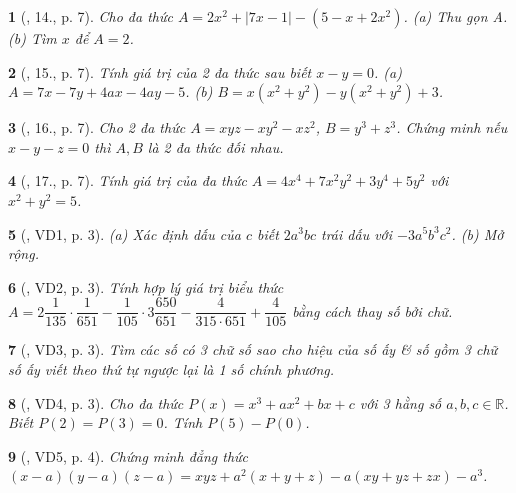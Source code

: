 \documentclass{article}
\newtheorem{baitoan}{}
\begin{document}
\begin{baitoan}[\cite{Tuyen_Toan_8}, 14., p. 7]
	Cho đa thức $A = 2x^2 + |7x - 1| - (5 - x + 2x^2)$. (a) Thu gọn A. (b) Tìm $x$ để $A = 2$.
\end{baitoan}

\begin{baitoan}[\cite{Tuyen_Toan_8}, 15., p. 7]
	Tính giá trị của 2 đa thức sau biết $x - y = 0$. (a) $A = 7x - 7y + 4ax - 4ay - 5$. (b) $B = x(x^2 + y^2) - y(x^2 + y^2) + 3$.
\end{baitoan}

\begin{baitoan}[\cite{Tuyen_Toan_8}, 16., p. 7]
	Cho 2 đa thức $A = xyz - xy^2 - xz^2$, $B = y^3 + z^3$. Chứng minh nếu $x - y - z = 0$ thì $A,B$ là 2 đa thức đối nhau.
\end{baitoan}

\begin{baitoan}[\cite{Tuyen_Toan_8}, 17., p. 7]
	Tính giá trị của đa thức $A = 4x^4 + 7x^2y^2 + 3y^4 + 5y^2$ với $x^2 + y^2 = 5$.
\end{baitoan}

\begin{baitoan}[\cite{Binh_Toan_8_tap_1}, VD1, p. 3]
	(a) Xác định dấu của $c$ biết $2a^3bc$ trái dấu với $-3a^5b^3c^2$. (b) Mở rộng.
\end{baitoan}

\begin{baitoan}[\cite{Binh_Toan_8_tap_1}, VD2, p. 3]
	Tính hợp lý giá trị biểu thức $A = 2\dfrac{1}{135}\cdot\dfrac{1}{651} - \dfrac{1}{105}\cdot3\dfrac{650}{651} - \dfrac{4}{315\cdot651} + \dfrac{4}{105}$ bằng cách thay số bởi chữ.
\end{baitoan}

\begin{baitoan}[\cite{Binh_Toan_8_tap_1}, VD3, p. 3]
	Tìm các số có 3 chữ số sao cho hiệu của số ấy \& số gồm 3 chữ số ấy viết theo thứ tự ngược lại là 1 số chính phương.
\end{baitoan}

\begin{baitoan}[\cite{Binh_Toan_8_tap_1}, VD4, p. 3]
	Cho đa thức $P(x) = x^3 + ax^2 + bx + c$ với 3 hằng số $a,b,c\in\mathbb{R}$. Biết $P(2) = P(3) = 0$. Tính $P(5) - P(0)$.
\end{baitoan}

\begin{baitoan}[\cite{Binh_Toan_8_tap_1}, VD5, p. 4]
	Chứng minh đẳng thức $(x - a)(y - a)(z - a) = xyz + a^2(x + y + z) - a(xy + yz + zx) - a^3$.
\end{baitoan}
\end{document}

